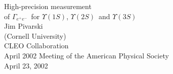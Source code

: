 

\def\ys{$\Upsilon(1S)$}
\def\yss{$\Upsilon(2S)$}
\def\ysss{$\Upsilon(3S)$}
\def\gamee{$\Gamma_{e^+e^-}$}

\newcommand{\talktitle}[0]{\gamee for \ys, \yss\  and \ysss}
\newcommand{\fmttitle}[0]{}
\newcommand{\conftitle}[0]{April 2002 Meeting of the American Physical Society}
\newcommand{\myname}[0]{Jim Pivarski}
\newcommand{\affila}[0]{Cornell University}
\newcommand{\talkdate}[0]{April 23, 2002}

\pagestyle{conference}   %




\slideheight 7.0in
\slidewidth 8.8in 

\renewcommand{\arraystretch}{0.3}
\renewcommand{\slidetopmargin}{0.4in}
\renewcommand{\slidebottommargin}{0.9in}



\begin{slide*}

\slideframe{}

\begin{center}
\vspace{4 cm}
{\Huge High-precision measurement \\
\vspace{0.25 cm}
of \gamee\  for \ys, \yss\  and \ysss}  \\
\vspace{1 cm}
{\LARGE	Jim Pivarski } \\
\vspace{0.25 cm}
{\Large	(Cornell University) } \\
\vspace{1 cm}
{\LARGE	CLEO Collaboration } \\
\vspace{2 cm}
\conftitle \\
{\large \talkdate}

\end{center}

\end{slide*}

